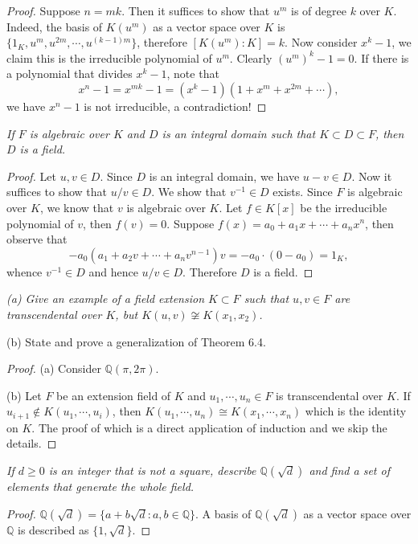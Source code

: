 \begin{proof}
Suppose $n=mk$. Then it suffices to show that $u^m$ is of degree $k$ over $K$. Indeed, the basis of $K(u^m)$ as a vector space over $K$ is $\{1_K,u^m,u^{2m},\cdots,u^{(k-1)m}\}$, therefore $[K(u^m):K]=k$. Now consider $x^k-1$, we claim this is the irreducible polynomial of $u^m$. Clearly $(u^m)^k-1=0$. If there is a polynomial that divides $x^k-1$, note that 
$$
x^n-1=x^{mk}-1=\left( x^k-1 \right) \left( 1+x^m+x^{2m}+\cdots \right) ,
$$
we have $x^n-1$ is not irreducible, a contradiction!
\end{proof}
\begin{problem}\em
If $F$ is algebraic over $K$ and $D$ is an integral domain such that $K\subset D\subset F$, then $D$ is a field.
\end{problem}
\begin{proof}
Let $u,v\in D$. Since $D$ is an integral domain, we have $u-v\in D$. Now it suffices to show that $u/v\in D$. We show that $v^{-1}\in D$ exists. Since $F$ is algebraic over $K$, we know that $v$ is algebraic over $K$. Let $f\in K[x]$ be the irreducible polynomial of $v$, then $f(v)=0$. Suppose $f(x)=a_0+a_1x+\cdots+a_nx^n$, then observe that 
$$
-a_0\left( a_1+a_2v+\cdots +a_nv^{n-1} \right) v=-a_0\cdot \left( 0-a_0 \right) =1_K,
$$
whence $v^{-1}\in D$ and hence $u/v\in D$. Therefore $D$ is a field.
\end{proof}
\begin{problem}\em
(a) Give an example of a field extension $K\subset F$ such that $u,v\in F$ are transcendental over $K$, but $K(u,v)\not\cong K(x_1,x_2)$.\par
(b) State and prove a generalization of Theorem 6.4.
\end{problem}
\begin{proof}
(a) Consider $\mathbb{Q}(\pi,2\pi)$.\par
(b) Let $F$ be an extension field of $K$ and $u_1,\cdots,u_n\in F$ is transcendental over $K$. If $u_{i+1}\notin K(u_1,\cdots,u_i)$, then $K(u_1,\cdots,u_n)\cong K(x_1,\cdots,x_n)$ which is the identity on $K$. The proof of which is a direct application of induction and we skip the details.
\end{proof}
\begin{problem}\em
If $d\ge 0$ is an integer that is not a square, describe $\mathbb{Q}(\sqrt{d})$ and find a set of elements that generate the whole field.
\end{problem}
\begin{proof}
$\mathbb{Q}(\sqrt{d})=\{a+b\sqrt{d}:a,b\in\mathbb{Q}\}$. A basis of $\mathbb{Q}(\sqrt{d})$ as a vector space over $\mathbb{Q}$ is described as $\{1,\sqrt{d}\}$.
\end{proof}
